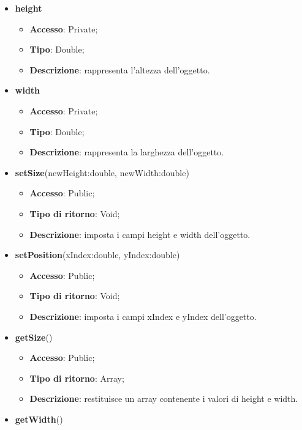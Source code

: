 {\begin{itemize}
\begin{itemize}
			\end{itemize}
			\item \textbf{height}
			\begin{itemize}
				\item \textbf{Accesso}: Private;
				\item \textbf{Tipo}: Double;
				\item \textbf{Descrizione}: rappresenta l’altezza dell’oggetto.
			\end{itemize}
			\item \textbf{width}
			\begin{itemize}
				\item \textbf{Accesso}: Private;
				\item \textbf{Tipo}: Double;
				\item \textbf{Descrizione}: rappresenta la larghezza dell’oggetto.
			\end{itemize}
		\end{itemize}
		\begin{itemize}
			\item \textbf{setSize}(newHeight:double, newWidth:double)
			\begin{itemize}
				\item \textbf{Accesso}: Public;
				\item \textbf{Tipo di ritorno}: Void;
				\item \textbf{Descrizione}: imposta i campi height e width dell’oggetto.
			\end{itemize}
			\item \textbf{setPosition}(xIndex:double, yIndex:double)
			\begin{itemize}
				\item \textbf{Accesso}: Public;
				\item \textbf{Tipo di ritorno}: Void;
				\item \textbf{Descrizione}: imposta i campi xIndex e yIndex dell’oggetto.
			\end{itemize}
			\item \textbf{getSize}()
			\begin{itemize}
				\item \textbf{Accesso}: Public;
				\item \textbf{Tipo di ritorno}: Array;
				\item \textbf{Descrizione}: restituisce un array contenente i valori di height e width.
			\end{itemize}
			\item \textbf{getWidth}()

\end{itemize}}
